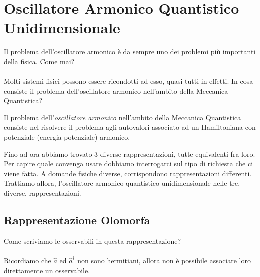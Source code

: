 \section{Oscillatore Armonico Quantistico Unidimensionale}

	Il problema dell'oscillatore armonico è da sempre uno dei problemi più importanti della fisica. Come mai?
	\\
	\\
	Molti sistemi fisici possono essere ricondotti ad esso, quasi tutti in effetti. In cosa consiste il problema dell'oscillatore armonico nell'ambito della Meccanica Quantistica?

\begin{nb}
	Il problema dell'\textit{oscillatore armonico} nell'ambito della Meccanica Quantistica consiste nel risolvere il problema agli autovalori associato ad un Hamiltoniana con potenziale (energia potenziale) armonico.
\end{nb}

	Fino ad ora abbiamo trovato 3 diverse rappresentazioni, tutte equivalenti fra loro. Per capire quale convenga usare dobbiamo interrogarci sul tipo di richiesta che ci viene fatta. A domande fisiche diverse, corrispondono rappresentazioni differenti. Trattiamo allora, l'oscillatore armonico quantistico unidimensionale nelle tre, diverse, rappresentazioni.


\subsection{Rappresentazione Olomorfa}

	Come scriviamo le osservabili in questa rappresentazione?
	\\
	\\
	Ricordiamo che $\hat{a}$ ed $\hat{a}^{\dagger}$ non sono hermitiani, allora non è possibile associare loro direttamente un osservabile.

